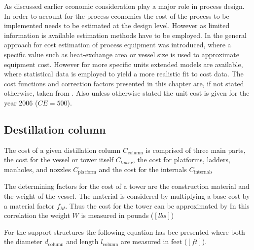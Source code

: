 As discussed earlier economic consideration play a major role in process design. In order to account
for the process economics the cost of the process to be implemented needs to be estimated at the design
level. However as limited information is available estimation methods have to be employed. In
 the general approach for cost estimation of process equipment was
introduced, where a specific value such as heat-exchange area or vessel size is used to approximate
equipment cost. However for more specific units extended models are available, where statistical
data is employed to yield a more realistic fit to cost data. The cost functions and correction
factors presented in this chapter are, if not stated otherwise, taken from \cite{Seider.2010}.
Also unless otherwise stated the unit cost is given for the year 2006 ($CE = 500$).
	
\subsection{Destillation column}
    The cost of a given distillation column $C_{\text{column}}$ is comprised of three main parts, the cost
    for the vessel or tower itself $C_{tower}$, the cost for platforms, ladders, manholes, and nozzles
    $C_{\text{platform}}$ and the cost for the internals $C_{\text{internals}}$
	
    The determining factors for the cost of a tower are the construction material and the weight of the vessel.
    The material is considered by multiplying a base cost by a material factor $f_M$. Thus the cost for
    the tower can be approximated by
    In this correlation the weight $W$ is measured in pounds ($[lbs]$)

    For the support structures the following equation has bee presented
    where both the diameter $d_{\text{column}}$ and length $l_{\text{column}}$ are measured in feet ($[ft]$).
	

